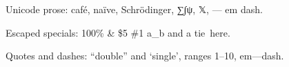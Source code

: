 Unicode prose: café, naïve, Schrödinger, ∑∫ψ, 𝕏, — em dash.

Escaped specials: 100\% \& \$5 \#1 a\_b and a tie~here.

Quotes and dashes: ``double'' and `single', ranges 1--10, em---dash.
